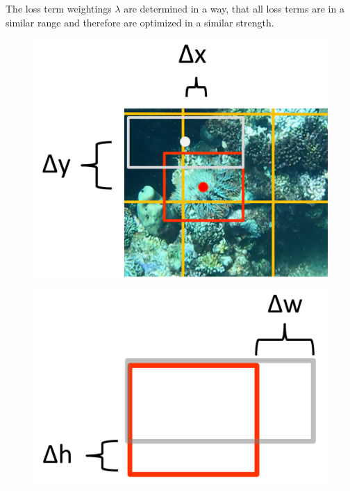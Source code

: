 \documentclass[landscape,a2,final,12pt]{issposter}
\begin{document}
\begin{samepage}
\begin{multicols}{3}
\begin{minipage}[b]{0.3\textwidth}
\begin{scriptsize}
            The loss term weightings $\lambda$ are determined in a way, that all loss terms are in a 
            similar range and therefore are optimized in a similar strength.

            \begin{figure}
                \centering
                \begin{minipage}{.5\textwidth}
                \centering
                \includegraphics[width=.4\linewidth]{5_loss_center.png}
                \label{fig:test1}
                \end{minipage}%
                \begin{minipage}{.5\textwidth}
                \centering
                \includegraphics[width=.4\linewidth]{5_loss_size.png}
                \label{fig:test2}
                \end{minipage}
                \end{figure}
            

            \end{scriptsize}
        \end{minipage}

    \columnbreak

\end{multicols}
\end{samepage}
\end{document}
